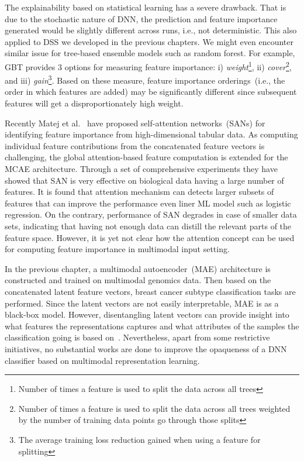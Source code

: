 \hspace*{3.5mm} The explainability based on statistical learning has a severe drawback. That is due to the stochastic nature of DNN, the prediction and feature importance generated would be slightly different across runs, i.e., not deterministic. This also applied to DSS we developed in the previous chapters. We might even encounter similar issue for tree-based ensemble models such as random forest. For example, GBT provides 3 options for measuring feature importance: i) \emph{weight}\footnote{Number of times a feature is used to split the data across all trees}, ii) \emph{cover}\footnote{Number of times a feature is used to split the data across all trees weighted by the number of training data points go through those splits}, and iii) \emph{gain}\footnote{The average training loss reduction gained when using a feature for splitting}. Based on these measure, feature importance orderings~(i.e., the order in which features are added) may be significantly different since subsequent features will get a disproportionately high weight. 

\hspace*{3.5mm} Recently Matej et al.~\cite{vskrlj2020feature} have proposed self-attention networks~(SANs) for identifying feature importance from high-dimensional tabular data. As computing individual feature contributions from the concatenated feature vectors is challenging, the global attention-based feature computation is extended for the MCAE architecture. Through a set of comprehensive experiments they have showed that SAN is very effective on biological data having a large number of features. It is found that attention mechanism can detects larger subsets of features that can improve the performance even liner ML model such as logistic regression. On the contrary, performance of SAN degrades in case of smaller data sets, indicating that having not enough data can distill the relevant parts of the feature space. However, it is yet not clear how the attention concept can be used for computing feature importance in multimodal input setting.

\hspace*{3.5mm} In the previous chapter, a multimodal autoencoder~(MAE) architecture is constructed and trained on multimodal genomics data. Then based on the concatenated latent feature vectors, breast cancer subtype classification tasks are performed. Since the latent vectors are not easily interpretable, MAE is as a black-box model. However, disentangling latent vectors can provide insight into what features the representations captures and what attributes of the samples the classification going is based on~\cite{karimTCBB2020}. Nevertheless, apart from some restrictive initiatives, no substantial works are done to improve the opaqueness of a DNN classifier based on multimodal representation learning. %

